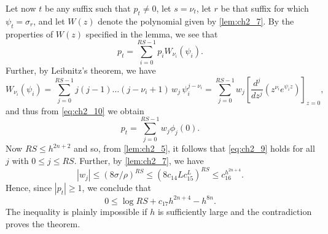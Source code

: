 Let now $t$ be any suffix such that $p_t \neq 0$, let $s = \nu_t$, let $r$ be that suffix for which $\psi_t = \sigma_r$, and let $W(z)$ denote the polynomial given by \autoref{lem:ch2_7}. By the properties of $W(z)$ specified in the lemma, we see that
\[
p_t = \sum_{i=0}^{RS-1} p_i W_{\nu_i}(\psi_i).
\]
Further, by Leibnitz's theorem, we have
\[
W_{\nu_i}(\psi_i) = \sum_{j=0}^{RS-1} j(j-1) \dots (j-\nu_i+1) \, w_j \, \psi_i^{j-\nu_i} = \sum_{j=0}^{RS-1} w_j \left[ \frac{d^j}{dz^j} (z^{\nu_i} e^{\psi_i z}) \right]_{z=0},
\]
and thus from \eqref{eq:ch2_10} we obtain
\[
p_t = \sum_{j=0}^{RS-1} w_j \phi_j(0).
\]
Now $RS \le h^{2n+2}$ and so, from \autoref{lem:ch2_5}, it follows that \eqref{eq:ch2_9} holds for all $j$ with $0 \le j \le RS$. Further, by \autoref{lem:ch2_7}, we have
\[
|w_j| \le (8\sigma/\rho)^{RS} \le (8c_{14}Lc_{15}^L)^{RS} \le c_{16}^{h^{2n+4}}.
\]
Hence, since $|p_t| \ge 1$, we conclude that
\[
0 \le \log RS + c_{17}h^{2n+4} - h^{8n}.
\]
The inequality is plainly impossible if $h$ is sufficiently large and the contradiction proves the theorem.